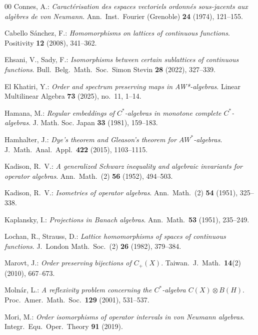 \documentclass[12pt]{amsart}
\theoremstyle{definition}
\theoremstyle{remark}
\numberwithin{equation}{section}
\begin{document}
\begin{thebibliography}{00}
	Connes, A.: \textit{Caractérisation des espaces vectoriels ordonnés sous-jacents aux algèbres de von Neumann}. Ann.\ Inst.\ Fourier (Grenoble) \textbf{24} (1974), 121--155.
	
	Cabello S\'anchez, F.: \textit{Homomorphisms on lattices of continuous functions}. Positivity \textbf{12} (2008), 341--362.
	
	Ehsani, V., Sady, F.: \textit{Isomorphisms between certain sublattices of continuous functions}. Bull.\ Belg.\ Math.\ Soc.\ Simon Stevin \textbf{28} (2022), 327--339. 
	
El Khatiri, Y.: \textit{Order and spectrum preserving maps in AW*-algebras}. Linear Multilinear Algebra \textbf{73} (2025), no.~11, 1--14.



	
	Hamana, M.: \textit{Regular embeddings of $C^{*}$-algebras in monotone complete $C^{*}$-algebras}. J. Math. Soc. Japan \textbf{33} (1981), 159--183.
 
	
	
	Hamhalter, J.: \textit{Dye’s theorem and Gleason’s theorem for $AW^{*}$-algebras}. J.\ Math.\ Anal.\ Appl.\ \textbf{422} (2015), 1103--1115.
	
	Kadison, R.\ V.: \textit{A generalized Schwarz inequality and algebraic invariants for operator algebras}. Ann.\ Math.\ (2) \textbf{56} (1952), 494--503. 
	
	Kadison, R.\ V.: \textit{Isometries of operator algebras}. Ann.\ Math.\ (2) \textbf{54} (1951), 325--338.
	
	Kaplansky, I.: \textit{Projections in Banach algebras}. Ann.\ Math.\ \textbf{53} (1951), 235--249.
	
	Lochan, R., Strauss, D.: \textit{Lattice homomorphisms of spaces of continuous functions}. J.\ London Math.\ Soc.\ (2) \textbf{26} (1982), 379--384.
	
	Marovt, J.: \textit{Order preserving bijections of $C_{+}(X)$}. Taiwan.\ J.\ Math.\ \textbf{14}(2) (2010), 667--673.
	
	Moln\'ar, L.: \textit{A reflexivity problem concerning the $C^{*}$-algebra $C(X)\otimes B(H)$}. Proc.\ Amer.\ Math.\ Soc.\ \textbf{129} (2001), 531--537.
	
	Mori, M.: \textit{Order isomorphisms of operator intervals in von Neumann algebras}. Integr.\ Equ.\ Oper.\ Theory \textbf{91} (2019).
	

\end{thebibliography}
\end{document}
